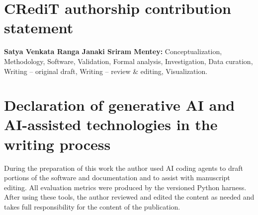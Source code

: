\documentclass[preprint,review,12pt]{elsarticle}
\begin{document}
\section*{CRediT authorship contribution statement}
\textbf{Satya Venkata Ranga Janaki Sriram Mentey:} Conceptualization,
Methodology, Software, Validation, Formal analysis, Investigation, Data
curation, Writing -- original draft, Writing -- review \& editing,
Visualization.

\section*{Declaration of generative AI and AI-assisted technologies in the writing process}
During the preparation of this work the author used AI coding agents to draft
portions of the software and documentation and to assist with manuscript
editing. All evaluation metrics were produced by the versioned Python harness.
After using these tools, the author reviewed and edited the content as needed
and takes full responsibility for the content of the publication.



\end{document}
